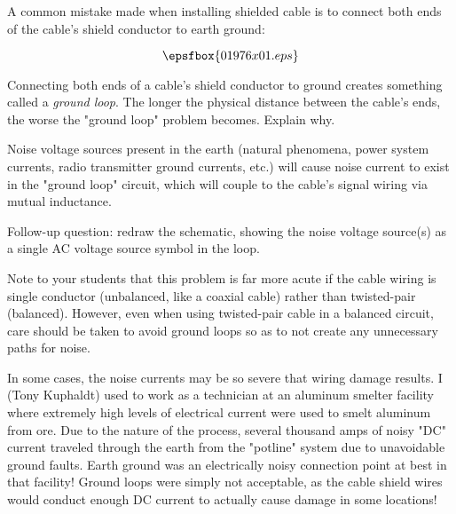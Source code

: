 

A common mistake made when installing shielded cable is to connect both ends of the cable's shield conductor to earth ground:

$$\epsfbox{01976x01.eps}$$

Connecting both ends of a cable's shield conductor to ground creates something called a {\it ground loop}.  The longer the physical distance between the cable's ends, the worse the "ground loop" problem becomes.  Explain why.







Noise voltage sources present in the earth (natural phenomena, power system currents, radio transmitter ground currents, etc.) will cause noise current to exist in the "ground loop" circuit, which will couple to the cable's signal wiring via mutual inductance.

\vskip 10pt

Follow-up question: redraw the schematic, showing the noise voltage source(s) as a single AC voltage source symbol in the loop.







Note to your students that this problem is far more acute if the cable wiring is single conductor (unbalanced, like a coaxial cable) rather than twisted-pair (balanced).  However, even when using twisted-pair cable in a balanced circuit, care should be taken to avoid ground loops so as to not create any unnecessary paths for noise.

In some cases, the noise currents may be so severe that wiring damage results.  I (Tony Kuphaldt) used to work as a technician at an aluminum smelter facility where extremely high levels of electrical current were used to smelt aluminum from ore.  Due to the nature of the process, several thousand amps of noisy "DC" current traveled through the earth from the "potline" system due to unavoidable ground faults.  Earth ground was an electrically noisy connection point at best in that facility!  Ground loops were simply not acceptable, as the cable shield wires would conduct enough DC current to actually cause damage in some locations!

